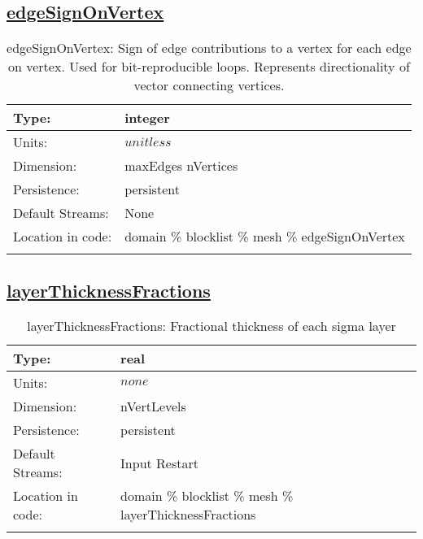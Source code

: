 \subsection[edgeSignOnVertex]{\hyperref[sec:var_tab_mesh]{edgeSignOnVertex}}
\label{subsec:var_sec_mesh_edgeSignOnVertex}
\begin{center}
\begin{longtable}{| p{2.0in} | p{4.0in} |}
        \hline 
        Type: & integer \\
        \hline 
        Units: & $unitless$ \\
        \hline 
        Dimension: & maxEdges nVertices \\
        \hline 
        Persistence: & persistent \\
        \hline 
		 Default Streams: & None \\
        \hline 
		 Location in code: & domain \% blocklist \% mesh \% edgeSignOnVertex \\
		 \hline 
    \caption{edgeSignOnVertex: Sign of edge contributions to a vertex for each edge on vertex. Used for bit-reproducible loops. Represents directionality of vector connecting vertices.}
\end{longtable}
\end{center}
\subsection[layerThicknessFractions]{\hyperref[sec:var_tab_mesh]{layerThicknessFractions}}
\label{subsec:var_sec_mesh_layerThicknessFractions}
\begin{center}
\begin{longtable}{| p{2.0in} | p{4.0in} |}
        \hline 
        Type: & real \\
        \hline 
        Units: & $none$ \\
        \hline 
        Dimension: & nVertLevels \\
        \hline 
        Persistence: & persistent \\
        \hline 
		 Default Streams: & Input Restart  \\
        \hline 
		 Location in code: & domain \% blocklist \% mesh \% layerThicknessFractions \\
		 \hline 
    \caption{layerThicknessFractions: Fractional thickness of each sigma layer}
\end{longtable}
\end{center}
